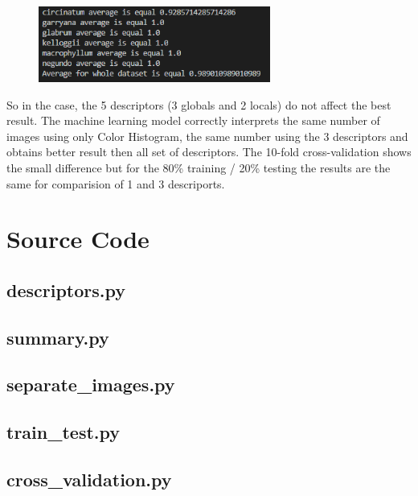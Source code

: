 \documentclass[12pt]{article}
\begin{document}
\begin{figure}[h!]
\centering
\includegraphics[width=3in]{results_histo.png}
\end{figure}

So in the case, the 5 descriptors (3 globals and 2 locals) do not affect the best result. The machine learning model correctly interprets the same number of images using only Color Histogram, the same number using the 3 descriptors and obtains better result then all set of descriptors. The 10-fold cross-validation shows the small difference but for the 80\% training / 20\% testing the results are the same for comparision of 1 and 3 descriports.

\section{Source Code}

\subsection{descriptors.py}


\subsection{summary.py}


\subsection{separate\_images.py}


\subsection{train\_test.py}


\subsection{cross\_validation.py}

\end{document}
